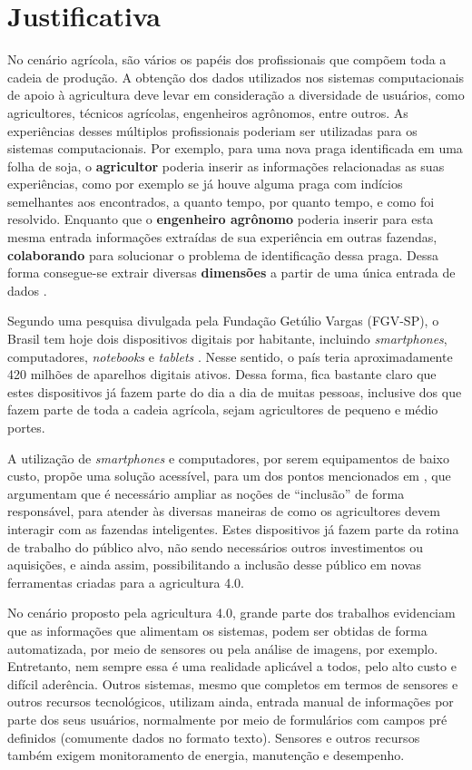 \documentclass[12pt]{article}
\begin{document}
\section{Justificativa}
\label{sec:justificativa}

No cenário agrícola, são vários os papéis dos profissionais que compõem toda a cadeia de produção. A obtenção dos dados utilizados nos sistemas computacionais de apoio à agricultura deve levar em consideração a diversidade de usuários, como agricultores, técnicos agrícolas, engenheiros agrônomos, entre outros. As experiências desses múltiplos profissionais poderiam ser utilizadas para os sistemas computacionais. Por exemplo, para uma nova praga identificada em uma folha de soja, o \textbf{agricultor} poderia inserir as informações relacionadas as suas experiências, como por exemplo se já houve alguma praga com indícios semelhantes aos encontrados, a quanto tempo, por quanto tempo, e como foi resolvido. Enquanto que o \textbf{engenheiro agrônomo} poderia inserir para esta mesma entrada informações extraídas de sua experiência em outras fazendas, \textbf{colaborando} para solucionar o problema de identificação dessa praga. Dessa forma consegue-se extrair diversas \textbf{dimensões} a partir de uma única entrada de dados \cite{Walling:2020}.

Segundo uma pesquisa divulgada pela Fundação Getúlio Vargas (FGV-SP), o Brasil tem hoje dois dispositivos digitais por habitante, incluindo \textit{smartphones}, computadores, \textit{notebooks} e \textit{tablets} \cite{FGV:2020}. Nesse sentido, o país teria aproximadamente 420 milhões de aparelhos digitais ativos. Dessa forma, fica bastante claro que estes dispositivos já fazem parte do dia a dia de muitas pessoas, inclusive dos que fazem parte de toda a cadeia agrícola, sejam agricultores de pequeno e médio portes.

A utilização de \textit{smartphones} e computadores, por serem equipamentos de baixo custo, propõe uma solução acessível, para um dos pontos mencionados em , que argumentam que é necessário ampliar as noções de ``inclusão'' de forma responsável, para atender às diversas maneiras de como os agricultores devem interagir com as fazendas inteligentes. Estes dispositivos já fazem parte da rotina de trabalho do público alvo, não sendo necessários outros investimentos ou aquisições, e ainda assim, possibilitando a inclusão desse público em novas ferramentas criadas para a agricultura 4.0.

No cenário proposto pela agricultura 4.0, grande parte dos trabalhos evidenciam que as informações que alimentam os sistemas, podem ser obtidas de forma automatizada, por meio de sensores ou pela análise de imagens, por exemplo. Entretanto, nem sempre essa é uma realidade aplicável a todos, pelo alto custo e difícil aderência. Outros sistemas, mesmo que completos em termos de sensores e outros recursos tecnológicos, utilizam ainda, entrada manual de informações por parte dos seus usuários, normalmente por meio de formulários com campos pré definidos (comumente dados no formato texto). Sensores e outros recursos também exigem monitoramento de energia, manutenção e desempenho.
\end{document}
